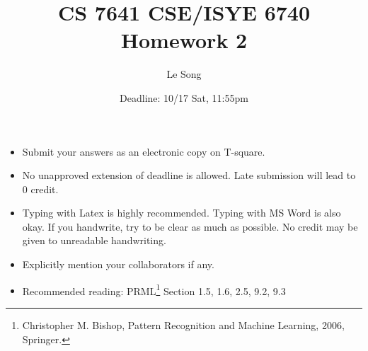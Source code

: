 \documentclass[twoside,10pt]{article}
\begin{document}
\title{CS 7641 CSE/ISYE 6740 Homework 2}
\author{Le Song}
\date{Deadline: 10/17 Sat, 11:55pm
} \maketitle

\begin{itemize}
  \item Submit your answers as an electronic copy on T-square.
  \item No unapproved extension of deadline is allowed. Late
  submission will lead to 0 credit.
  \item Typing with Latex is highly recommended. Typing with MS Word is also okay.
  If you handwrite, try to be clear as much as possible. No credit may be given to unreadable handwriting.
  \item Explicitly mention your collaborators if any.
  \item Recommended reading: PRML\footnote{Christopher M. Bishop, Pattern Recognition and Machine
Learning, 2006, Springer.} Section 1.5, 1.6, 2.5, 9.2, 9.3

\end{itemize}
\end{document}
